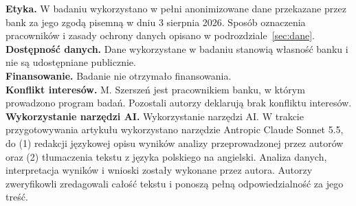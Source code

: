 \documentclass[11pt]{article}
\begin{document}
\noindent\textbf{Etyka.}
W badaniu wykorzystano w pełni anonimizowane dane przekazane przez bank za jego zgodą
pisemną w dniu 3 sierpnia 2026. Sposób oznaczenia pracowników i zasady ochrony danych opisano
w podrozdziale~\ref{sec:dane}.\\
\textbf{Dostępność danych.}
Dane wykorzystane w badaniu stanowią własność banku i nie są
udostępniane publicznie.\\
\textbf{Finansowanie.}
Badanie nie otrzymało finansowania.\\
\textbf{Konflikt interesów.}
M. Szerszeń jest pracownikiem banku, w którym prowadzono program badań. Pozostali autorzy deklarują
brak konfliktu interesów.\\
\textbf{Wykorzystanie narzędzi AI.}
Wykorzystanie narzędzi AI. W trakcie przygotowywania artykułu wykorzystano narzędzie Antropic Claude Sonnet 5.5, do (1) redakcji językowej opisu wyników analizy przeprowadzonej przez autorów oraz (2) tłumaczenia tekstu z języka polskiego na angielski. Analiza danych, interpretacja wyników i wnioski zostały wykonane przez autora. Autorzy zweryfikowli zredagowali całość tekstu i ponoszą pełną odpowiedzialność za jego treść.


\end{document}

